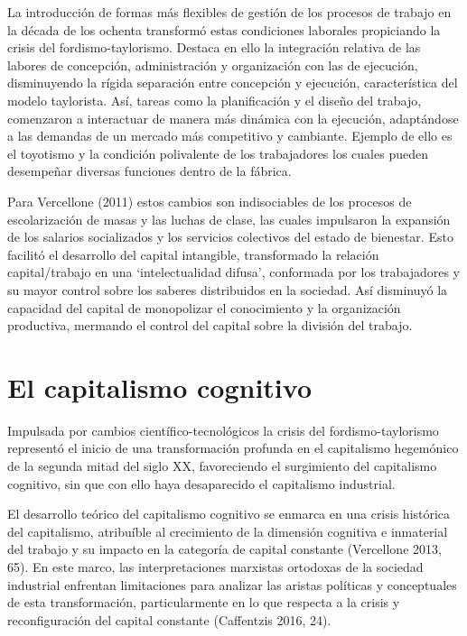 \documentclass[
]{interact}
\begin{document}
La introducción de formas más flexibles de gestión de los procesos de
trabajo en la década de los ochenta transformó estas condiciones
laborales propiciando la crisis del fordismo-taylorismo. Destaca en ello
la integración relativa de las labores de concepción, administración y
organización con las de ejecución, disminuyendo la rígida separación
entre concepción y ejecución, característica del modelo taylorista. Así,
tareas como la planificación y el diseño del trabajo, comenzaron a
interactuar de manera más dinámica con la ejecución, adaptándose a las
demandas de un mercado más competitivo y cambiante. Ejemplo de ello es
el toyotismo y la condición polivalente de los trabajadores los cuales
pueden desempeñar diversas funciones dentro de la fábrica.

Para Vercellone (2011) estos cambios son indisociables de los procesos
de escolarización de masas y las luchas de clase, las cuales impulsaron
la expansión de los salarios socializados y los servicios colectivos del
estado de bienestar. Esto facilitó el desarrollo del capital intangible,
transformado la relación capital/trabajo en una `intelectualidad
difusa', conformada por los trabajadores y su mayor control sobre los
saberes distribuidos en la sociedad. Así disminuyó la capacidad del
capital de monopolizar el conocimiento y la organización productiva,
mermando el control del capital sobre la división del trabajo.

\section{El capitalismo cognitivo}\label{el-capitalismo-cognitivo}

Impulsada por cambios científico-tecnológicos la crisis del
fordismo-taylorismo representó el inicio de una transformación profunda
en el capitalismo hegemónico de la segunda mitad del siglo XX,
favoreciendo el surgimiento del capitalismo cognitivo, sin que con ello
haya desaparecido el capitalismo industrial.

El desarrollo teórico del capitalismo cognitivo se enmarca en una crisis
histórica del capitalismo, atribuíble al crecimiento de la dimensión
cognitiva e inmaterial del trabajo y su impacto en la categoría de
capital constante (Vercellone 2013, 65). En este marco, las
interpretaciones marxistas ortodoxas de la sociedad industrial enfrentan
limitaciones para analizar las aristas políticas y conceptuales de esta
transformación, particularmente en lo que respecta a la crisis y
reconfiguración del capital constante (Caffentzis 2016, 24).
\end{document}
